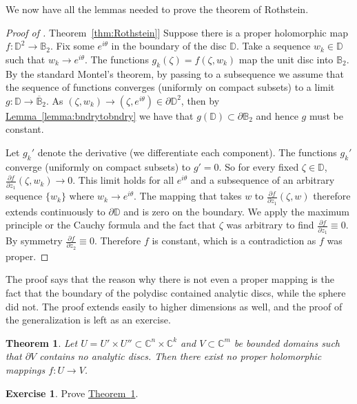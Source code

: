 \documentclass[12pt,openany]{book}
\newcommand{\C}{{\mathbb{C}}}
\newcommand{\D}{{\mathbb{D}}}
\newcommand{\bB}{{\mathbb{B}}}
\newcommand{\bD}{{\mathbb{D}}}
\theoremstyle{plain}
\newtheorem{thm}{Theorem}[section]
\theoremstyle{remark}
\theoremstyle{definition}
\newenvironment{exbox}{%
    \def\FrameCommand{\vrule width 1pt \relax\hspace {10pt}}%
    \MakeFramed {\advance \hsize -\width \FrameRestore }%
}{%
    \endMakeFramed
}
\theoremstyle{exercise}
\newtheorem{exercise}{Exercise}[section]
\theoremstyle{example}
\newcommand{\thmref}[1]{\hyperref[#1]{Theorem~\ref*{#1}}}
\newcommand{\lemmaref}[1]{\hyperref[#1]{Lemma~\ref*{#1}}}
\begin{document}
We now have all the lemmas needed to prove the theorem of Rothstein.

\begin{proof}[Proof of \thmref{thm:Rothstein}]
Suppose there is a proper holomorphic map $f \colon \D^2
\to \bB_2$.
Fix some $e^{i\theta}$ in the boundary of the disc $\bD$.  Take a sequence
$w_k \in \bD$ such that $w_k \to e^{i\theta}$.   The functions
$g_k(\zeta) =  f(\zeta,w_k)$ map the unit disc into $\bB_2$.  By the standard
Montel's theorem, by passing to a subsequence we assume that
the sequence of functions converges (uniformly on compact subsets) to
a limit $g \colon \bD \to \overline{\bB}_2$.  As $(\zeta,w_k) \to
(\zeta,e^{i\theta}) \in \partial \D^2$, then by
\lemmaref{lemma:bndrytobndry} we have that $g(\bD) \subset \partial \bB_2$
and hence $g$ must be constant.

Let $g_k'$ denote the derivative (we differentiate each component).
The functions $g_k'$ converge (uniformly on compact subsets)
to $g' = 0$. So for every fixed $\zeta \in \bD$,
$\frac{\partial f}{\partial z_1} (\zeta, w_k) \to 0$.
This limit holds for all $e^{i\theta}$ and a subsequence of
an arbitrary sequence $\{ w_k \}$ where $w_k \to e^{i\theta}$.  The mapping that takes $w$ to
$\frac{\partial f}{\partial z_1} (\zeta, w)$ therefore extends continuously
to $\partial \D$ and is zero on the boundary.
We apply the maximum
principle or the Cauchy formula and the fact that $\zeta$ was arbitrary to find 
$\frac{\partial f}{\partial z_1} \equiv 0$.  By symmetry
$\frac{\partial f}{\partial z_2} \equiv 0$.  Therefore $f$ is constant,
which is a contradiction as $f$ was proper.
\end{proof}

The proof says that the reason why there is not even a proper mapping is the fact
that the boundary of the polydisc contained analytic discs, while
the sphere did not.
The proof extends easily to higher dimensions as well, and the proof
of the generalization is left as an exercise.

\begin{thm} \label{thm:nopropmapprodandnodisc}
Let $U = U' \times U'' \subset \C^n \times \C^k$ and $V \subset \C^m$ be bounded
domains such that $\partial V$ contains no analytic discs.
Then there exist no proper
holomorphic mappings $f \colon U \to V$.
\end{thm}

\begin{exbox}
\begin{exercise}
Prove \thmref{thm:nopropmapprodandnodisc}.
\end{exercise}
\end{exbox}
\end{document}
